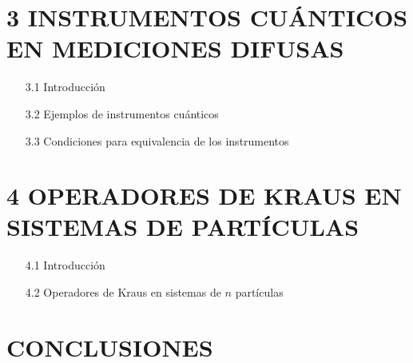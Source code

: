 \section*{3 INSTRUMENTOS CUÁNTICOS EN MEDICIONES DIFUSAS} 
\begin{itemize}
    \item [3.1] Introducción
    \item [3.2] Ejemplos de instrumentos cuánticos
    \item [3.3] Condiciones para equivalencia de los instrumentos
\end{itemize}

\section*{4 OPERADORES DE KRAUS EN SISTEMAS DE \texorpdfstring{}{n} PARTÍCULAS}
\begin{itemize}
\item[4.1] Introducción
\item[4.2] Operadores de Kraus en sistemas de $n$ partículas 
\end{itemize}




\section*{CONCLUSIONES }